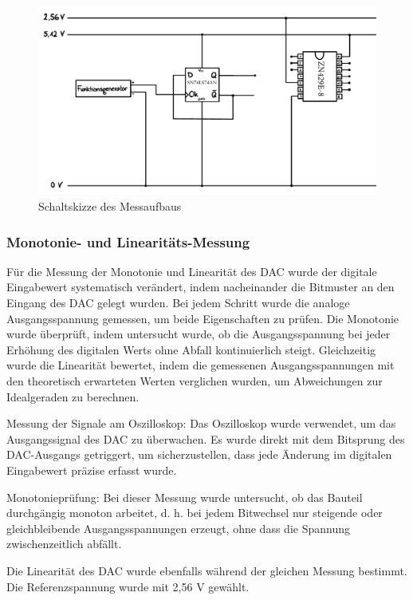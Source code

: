 \documentclass[a4paper,12pt]{article}
\begin{document}
\begin{figure}[H]
    \centering
    \includegraphics[width=1\textwidth]{../Quellen/Labor1/Versuch2/Schaltskizze.png}
    \caption{Schaltskizze des Messaufbaus}
\end{figure}

\subsubsection {Monotonie- und Linearitäts-Messung}

Für die Messung der Monotonie und Linearität des DAC wurde der digitale Eingabewert systematisch verändert, indem nacheinander die Bitmuster an den Eingang des DAC gelegt wurden. Bei jedem Schritt wurde die analoge Ausgangsspannung gemessen, um beide Eigenschaften zu prüfen. Die Monotonie wurde überprüft, indem untersucht wurde, ob die Ausgangsspannung bei jeder Erhöhung des digitalen Werts ohne Abfall kontinuierlich steigt. Gleichzeitig wurde die Linearität bewertet, indem die gemessenen Ausgangsspannungen mit den theoretisch erwarteten Werten verglichen wurden, um Abweichungen zur Idealgeraden zu berechnen.

\noindent Messung der Signale am Oszilloskop: Das Oszilloskop wurde verwendet, um das Ausgangssignal des DAC zu überwachen. Es wurde direkt mit dem Bitsprung des DAC-Ausgangs getriggert, um sicherzustellen, dass jede Änderung im digitalen Eingabewert präzise erfasst wurde.

\noindent Monotonieprüfung: Bei dieser Messung wurde untersucht, ob das Bauteil durchgängig monoton arbeitet, d. h. bei jedem Bitwechsel nur steigende oder gleichbleibende Ausgangsspannungen erzeugt, ohne dass die Spannung zwischenzeitlich abfällt.

Die Linearität des DAC wurde ebenfalls während der gleichen Messung bestimmt. Die Referenzspannung wurde mit 2,56 V gewählt.
\end{document}

